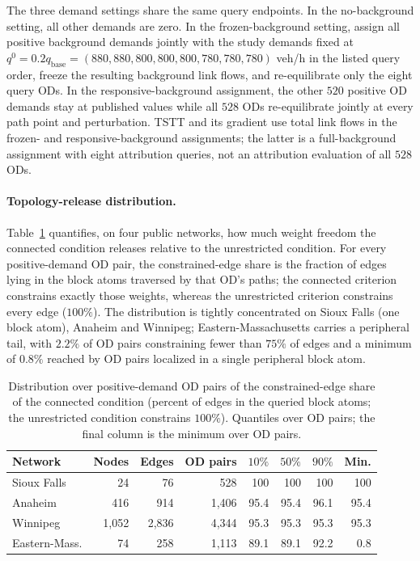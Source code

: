 The three demand settings share the same query endpoints. In the
no-background setting, all other demands are zero. In the
frozen-background setting, assign all positive
background demands jointly with the study demands fixed at
$q^0=0.2q_{\mathrm{base}}=(880,880,800,800,800,780,780,780)$ veh/h in
the listed query order, freeze the resulting background link flows, and
re-equilibrate only the eight query ODs. In the responsive-background assignment, the other $520$
positive OD demands stay at published values while all $528$ ODs
re-equilibrate jointly at every path point and perturbation. TSTT and
its gradient use total link flows in the frozen- and responsive-background assignments; the latter is a
full-background assignment with eight attribution queries, not an
attribution evaluation of all $528$ ODs.

\paragraph{Topology-release distribution.}
Table~\ref{tab:topologydist} quantifies, on four public networks, how
much weight freedom the connected condition releases relative to the
unrestricted condition. For every positive-demand OD pair, the
constrained-edge share is the fraction of edges lying in the block
atoms traversed by that OD's paths; the connected criterion constrains
exactly those weights, whereas the unrestricted criterion constrains
every edge ($100\%$). The distribution is tightly concentrated on Sioux
Falls (one block atom), Anaheim and Winnipeg; Eastern-Massachusetts
carries a peripheral tail, with $2.2\%$ of OD pairs constraining fewer
than $75\%$ of edges and a minimum of $0.8\%$ reached by OD pairs
localized in a single peripheral block atom.
\begin{table}[pos=htbp]\centering\footnotesize
\caption{Distribution over positive-demand OD pairs of the
constrained-edge share of the connected condition (percent of edges in
the queried block atoms; the unrestricted condition constrains
$100\%$). Quantiles over OD pairs; the final column is the minimum
over OD pairs.}\label{tab:topologydist}
\begin{tabular*}{\tblwidth}{@{\extracolsep{\fill}}lrrrrrrr}
\toprule
Network & Nodes & Edges & OD pairs & $10\%$ & $50\%$ & $90\%$ & Min.\\
\midrule
Sioux Falls & 24 & 76 & 528 & 100 & 100 & 100 & 100\\
Anaheim & 416 & 914 & 1{,}406 & 95.4 & 95.4 & 96.1 & 95.4\\
Winnipeg & 1{,}052 & 2{,}836 & 4{,}344 & 95.3 & 95.3 & 95.3 & 95.3\\
Eastern-Mass. & 74 & 258 & 1{,}113 & 89.1 & 89.1 & 92.2 & 0.8\\
\bottomrule\end{tabular*}\end{table}

